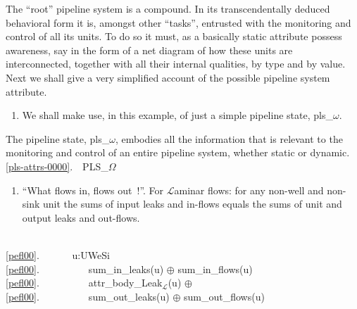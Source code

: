
\begynd
\pind The ``root'' pipeline system is a compound.
\pind In its transcendentally deduced behavioral form
\begynd
\pind it is, amongst other ``tasks'', entrusted with the monitoring
      and control of all its units.
\begynd
\pind To do so it must, as a basically static attribute
\pind possess awareness, say in the form of a net diagram
\begynd
\pind of how these units are interconnected,
\pind together with all their internal qualities, 
\pind by type and by value.
\afslut
\afslut
\pind Next we shall give a very simplified account of the possible
      pipeline system attribute.
\afslut
      
\mnewfoil
\begin{enumerate}\setei
\item \label{pls-attrs-0000} We shall make use, in this example, of
  just a simple pipeline state, \textsf{pls\_$\omega$}.
\savei\end{enumerate}

\noindent
\begynd
\pind The pipeline state, \textsf{pls\_$\omega$}, embodies all the
      information that is relevant to the monitoring and control of an
      entire pipeline system, whether static or dynamic.
\afslut
\bp
{}\\
\ref{pls-attrs-0000}.\ \ PLS\_$\Omega$ 
\ep


\begin{enumerate}\setei
\item \label{pefl00} ``What flows in, flows out~!''. For $\mathcal{L}$aminar
                     flows: for any non-well and non-sink  unit
                     the sums of input leaks and in-flows equals the
                     sums of unit and output leaks and out-flows.
\savei\end{enumerate}
\bp
\>\ \\
\ref{pefl00}.\ \ \ \ \ \ {\ALL} u:U{\SETMINUS}We{\SETMINUS}Si {\RDOT} \\
\ref{pefl00}.\ \ \ \ \ \ \ \ \ \ sum\_in\_leaks(u) $\oplus$ sum\_in\_flows(u) {\EQ}\\
\ref{pefl00}.\ \ \ \ \ \ \ \ \ \ attr\_body\_Leak$_{\mathcal{L}}$(u) $\oplus$ \\
\ref{pefl00}.\ \ \ \ \ \ \ \ \ \ sum\_out\_leaks(u) $\oplus$ sum\_out\_flows(u)
\ep

